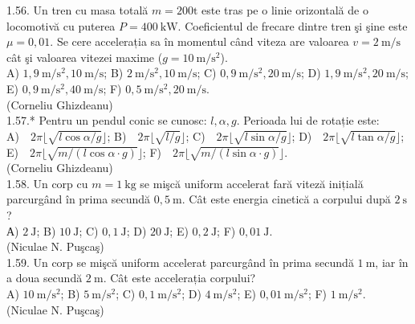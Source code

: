 1.56. Un tren cu masa totală $m=200 \mathrm{t}$ este tras pe o linie orizontală de o locomotivă cu puterea $P=400 \mathrm{~kW}$. Coeficientul de frecare dintre tren şi şine este $\mu=0,01$. Se cere accelerația sa în momentul când viteza are valoarea $v=2 \mathrm{~m} / \mathrm{s}$ cât şi valoarea vitezei maxime ($g=10 \mathrm{~m} / \mathrm{s}^{2}$).\\ A) $1,9 \mathrm{~m} / \mathrm{s}^{2}, 10 \mathrm{~m} / \mathrm{s}$; B) $2 \mathrm{~m} / \mathrm{s}^{2}, 10 \mathrm{~m} / \mathrm{s}$; C) $0,9 \mathrm{~m} / \mathrm{s}^{2}, 20 \mathrm{~m} / \mathrm{s}$; D) $1,9 \mathrm{~m} / \mathrm{s}^{2}, 20 \mathrm{~m} / \mathrm{s}$; E) $0,9 \mathrm{~m} / \mathrm{s}^{2}, 40 \mathrm{~m} / \mathrm{s}$; F) $0,5 \mathrm{~m} / \mathrm{s}^{2}, 20 \mathrm{~m} / \mathrm{s}$.\\ (Corneliu Ghizdeanu)\\

1.57.* Pentru un pendul conic se cunosc: $l, \alpha, g$. Perioada lui de rotație este:\\ A) $2\pi \lfloor \sqrt{l \cos \alpha / g} \rfloor$; B) $2\pi \lfloor \sqrt{l / g} \rfloor$; C) $2\pi \lfloor \sqrt{l \sin \alpha / g} \rfloor$; D) $2\pi \lfloor \sqrt{l \tan \alpha / g} \rfloor$; E) $2\pi \lfloor \sqrt{m / (l \cos \alpha \cdot g)} \rfloor$; F) $2\pi \lfloor \sqrt{m / (l \sin \alpha \cdot g)} \rfloor$.\\ (Corneliu Ghizdeanu)\\

1.58. Un corp cu $m=1 \mathrm{~kg}$ se mişcă uniform accelerat fară viteză inițială parcurgând în prima secundă $0,5 \mathrm{~m}$. Cât este energia cinetică a corpului după $2 \mathrm{~s}$?\\ А) $2 \mathrm{~J}$; B) $10 \mathrm{~J}$; C) $0,1 \mathrm{~J}$; D) $20 \mathrm{~J}$; E) $0,2 \mathrm{~J}$; F) $0,01 \mathrm{~J}$.\\ (Niculae N. Puşcaş)\\

1.59. Un corp se mişcă uniform accelerat parcurgând în prima secundă $1 \mathrm{~m}$, iar în a doua secundă $2 \mathrm{~m}$. Cât este accelerația corpului?\\ A) $10 \mathrm{~m} / \mathrm{s}^{2}$; B) $5 \mathrm{~m} / \mathrm{s}^{2}$; C) $0,1 \mathrm{~m} / \mathrm{s}^{2}$; D) $4 \mathrm{~m} / \mathrm{s}^{2}$; E) $0,01 \mathrm{~m} / \mathrm{s}^{2}$; F) $1 \mathrm{~m} / \mathrm{s}^{2}$.\\ (Niculae N. Puşcaş)\\

